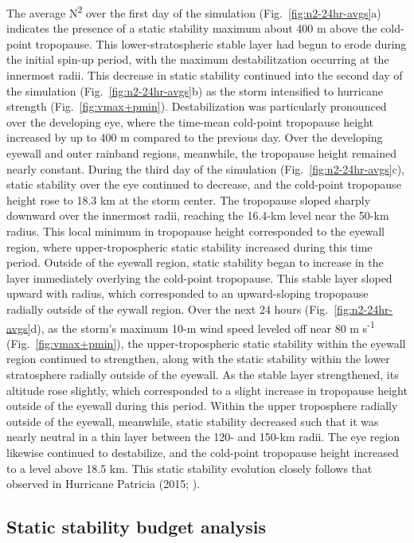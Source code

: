 \documentclass{ametsoc}
\begin{document}
The average N\textsuperscript{2} over the first day of the simulation (Fig.~\ref{fig:n2-24hr-avgs}a) indicates the presence of a static stability maximum about 400 m above the cold-point tropopause.
This lower-stratospheric stable layer had begun to erode during the initial spin-up period, with the maximum destabilitzation occurring at the innermost radii.
This decrease in static stability continued into the second day of the simulation (Fig.~\ref{fig:n2-24hr-avgs}b) as the storm intensified to hurricane strength (Fig.~\ref{fig:vmax+pmin}).
Destabilization was particularly pronounced over the developing eye, where the time-mean cold-point tropopause height increased by up to 400 m compared to the previous day.
Over the developing eyewall and outer rainband regions, meanwhile, the tropopause height remained nearly constant.
During the third day of the simulation (Fig.~\ref{fig:n2-24hr-avgs}c), static stability over the eye continued to decrease, and the cold-point tropopause height rose to 18.3 km at the storm center.
The tropopause sloped sharply downward over the innermost radii, reaching the 16.4-km level near the 50-km radius.
This local minimum in tropopause height corresponded to the eyewall region, where upper-tropospheric static stability increased during this time period.
Outside of the eyewall region, static stability began to increase in the layer immediately overlying the cold-point tropopause.
This stable layer sloped upward with radius, which corresponded to an upward-sloping tropopause radially outside of the eywall region.
Over the next 24 hours (Fig.~\ref{fig:n2-24hr-avgs}d), as the storm's maximum 10-m wind speed leveled off near 80 m s\textsuperscript{-1} (Fig.~\ref{fig:vmax+pmin}), the upper-tropospheric static stability within the eyewall region continued to strengthen, along with the static stability within the lower stratosphere radially outside of the eyewall.
As the stable layer strengthened, its altitude rose slightly, which corresponded to a slight increase in tropopause height outside of the eyewall during this period.
Within the upper troposphere radially outside of the eyewall, meanwhile, static stability decreased such that it was nearly neutral in a thin layer between the 120- and 150-km radii.
The eye region likewise continued to destabilize, and the cold-point tropopause height increased to a level above 18.5 km.
This static stability evolution closely follows that observed in Hurricane Patricia (2015; \citeauthor{Duran+Molinari2018} \citeyear{Duran+Molinari2018}).

 \subsection{Static stability budget analysis}
\end{document}
